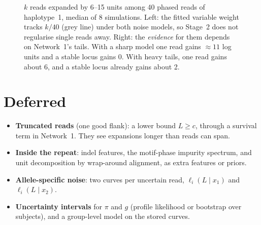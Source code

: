 \documentclass[10pt,a4paper]{article}
\begin{document}
\begin{figure}[H]
\centering
{}
\caption{$k$ reads expanded by 6--15 units among 40 phased reads of haplotype~1, median of 8 simulations. Left:
the fitted variable weight tracks $k/40$ (grey line) under both noise models, so Stage~2 does not regularise single
reads away. Right: the \emph{evidence} for them depends on Network~1's tails. With a sharp model one read gains
$\approx11$ log units and a stable locus gains 0. With heavy tails, one read gains about 6, and a stable locus already
gains about 2.}
\end{figure}

\section{Deferred}
\label{sec:later}
\begin{itemize}
\item \textbf{Truncated reads} (one good flank): a lower bound $L\geq c$, through a survival term in Network~1. They
see expansions longer than reads can span.
\item \textbf{Inside the repeat}: indel features, the motif-phase impurity spectrum, and unit decomposition by
wrap-around alignment, as extra features or priors.
\item \textbf{Allele-specific noise}: two curves per uncertain read, $\ell_i(L\mid x_1)$ and $\ell_i(L\mid x_2)$.
\item \textbf{Uncertainty intervals} for $\pi$ and $g$ (profile likelihood or bootstrap over subjects), and a group-level
model on the stored curves.
\end{itemize}
\end{document}
